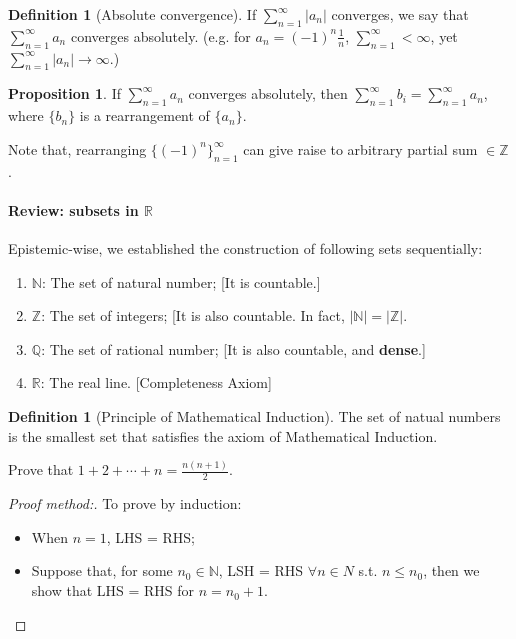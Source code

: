 \documentclass[12pt]{article}
\newcommand{\N}{{\mathbb N}}
\newcommand{\Q}{{\mathbb Q}}
\newcommand{\R}{{\mathbb R}}
\newcommand{\Z}{{\mathbb Z}}
\theoremstyle{definition}
\newtheorem{definition}[theorem]{Definition}
\newtheorem{proposition}[theorem]{Proposition}
\theoremstyle{plain}
\begin{document}
\begin{definition}
    [Absolute convergence]
    If $\sum_{n=1}^\infty |a_n|$ converges, we say that $\sum_{n=1}^\infty a_n$ 
    converges absolutely.
    (e.g. for $a_n = (-1)^n \frac{1}{n}$, $\sum_{n=1}^\infty < \infty$, yet 
    $\sum_{n=1}^\infty |a_n| \to \infty$.)
\end{definition}

\begin{proposition}
    If $\sum_{n=1}^\infty a_n$ converges absolutely, then $\sum_{n=1}^\infty b_i 
    = \sum_{n=1}^\infty a_n$, where $\{b_n\}$ is a rearrangement of $\{a_n\}$.
    
    Note that, rearranging $\{(-1)^n\}_{n=1}^\infty$ can give raise to arbitrary 
    partial sum $\in \Z$.
\end{proposition}

\paragraph{Review: subsets in $\R$}
Epistemic-wise, we established the construction of following sets sequentially: 
\begin{enumerate}
    \item $\N$: The set of natural number; [It is countable.]
    \item $\Z$: The set of integers; [It is also countable. In fact, $|\N| = |\Z|$.
    \item $\Q$: The set of rational number; [It is also countable, and 
        \textbf{dense}.]
    \item $\R$: The real line. [Completeness Axiom]
\end{enumerate}

\begin{definition}
    [Principle of Mathematical Induction]
    The set of natual numbers is the smallest set that satisfies the axiom of 
    Mathematical Induction.

    \begin{example}
        Prove that $1 + 2 + \cdots + n = \frac{n(n+1)}{2}$.
        \begin{proof}[Proof method:]
            To prove by induction: 
            \begin{itemize}
                \item When $n = 1$, LHS = RHS;
                \item Suppose that, for some $n_0 \in \N$, LSH = RHS $\forall n \in N$ s.t. $n \le n_0$, then 
                    we show that LHS = RHS for $n = n_0 + 1$.
            \end{itemize}
        \end{proof}
    \end{example}
\end{definition}
\end{document}
